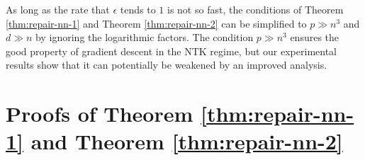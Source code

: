 \begin{remark}
As long as the rate that $\epsilon$ tends to $1$ is not so fast, the conditions of Theorem \ref{thm:repair-nn-1} and Theorem \ref{thm:repair-nn-2} can be simplified to $p\gg n^3$ and $d\gg n$ by ignoring the logarithmic factors. The condition $p\gg n^3$ ensures the good property of gradient descent in the NTK regime, but our experimental results show that it can potentially be weakened by an improved analysis.
\end{remark}

\iffalse
\begin{remark}
When the nonlinear activation is replaced by ReLU $\psi(t)=\max(t,0)$, \nb{add text}
\end{remark}
\fi


\section{Proofs of Theorem \ref{thm:repair-nn-1} and Theorem \ref{thm:repair-nn-2}}

